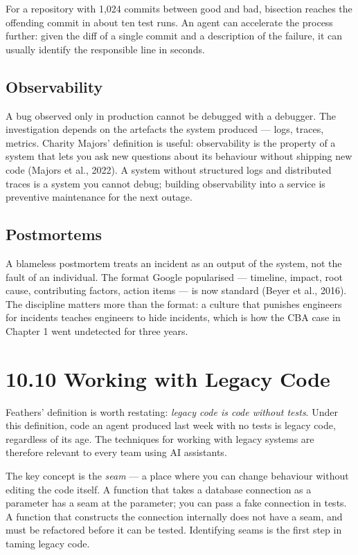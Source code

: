 \documentclass[11pt,a4paper]{book}
\begin{document}
For a repository with 1,024 commits between good and bad, bisection reaches the offending commit in about ten test runs. An agent can accelerate the process further: given the diff of a single commit and a description of the failure, it can usually identify the responsible line in seconds.

\subsection{Observability}

A bug observed only in production cannot be debugged with a debugger. The investigation depends on the artefacts the system produced --- logs, traces, metrics. Charity Majors' definition is useful: observability is the property of a system that lets you ask new questions about its behaviour without shipping new code (Majors et al., 2022). A system without structured logs and distributed traces is a system you cannot debug; building observability into a service is preventive maintenance for the next outage.

\subsection{Postmortems}

A blameless postmortem treats an incident as an output of the system, not the fault of an individual. The format Google popularised --- timeline, impact, root cause, contributing factors, action items --- is now standard (Beyer et al., 2016). The discipline matters more than the format: a culture that punishes engineers for incidents teaches engineers to hide incidents, which is how the CBA case in Chapter 1 went undetected for three years.

\medskip

\section{10.10 Working with Legacy Code}

Feathers' definition is worth restating: \textit{legacy code is code without tests}. Under this definition, code an agent produced last week with no tests is legacy code, regardless of its age. The techniques for working with legacy systems are therefore relevant to every team using AI assistants.

The key concept is the \textit{seam} --- a place where you can change behaviour without editing the code itself. A function that takes a database connection as a parameter has a seam at the parameter; you can pass a fake connection in tests. A function that constructs the connection internally does not have a seam, and must be refactored before it can be tested. Identifying seams is the first step in taming legacy code.
\end{document}
